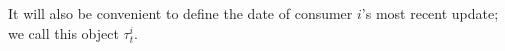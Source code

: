 \documentclass{handout}
\begin{document}
It will also be convenient to define the date of consumer
$i$'s most recent update; we call this object $\tau^{i}_{t}$.  

\end{document}
